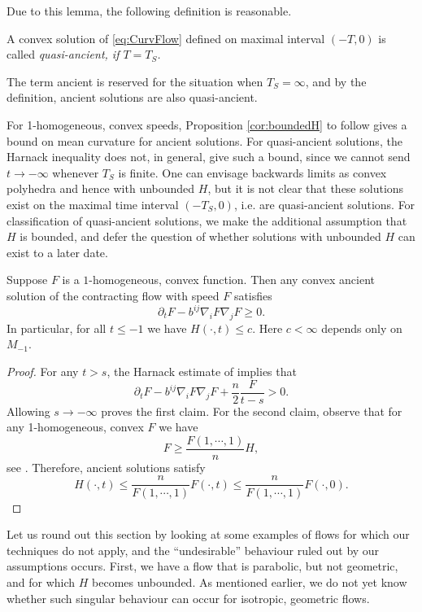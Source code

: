 \documentclass{amsart}
\begin{document}
Due to this lemma, the following definition is reasonable.

\begin{defn}
A convex solution of \eqref{eq:CurvFlow} defined on maximal interval $(-T,0)$ is called \it{quasi-ancient}, if $T=T_S$.
\end{defn}

The term ancient is reserved for the situation when \(T_S=\infty\), and by the definition, ancient solutions are also quasi-ancient.

For 1-homogeneous, convex speeds, Proposition \ref{cor:boundedH} to follow gives a bound on mean curvature for ancient solutions. For quasi-ancient solutions, the Harnack inequality does not, in general, give such a bound, since we cannot send \(t \to -\infty\) whenever \(T_S\) is finite. One can envisage backwards limits as convex polyhedra and hence with unbounded \(H\), but it is not clear that these solutions exist on the maximal time interval \((-T_S, 0)\), i.e. are quasi-ancient solutions. For classification of quasi-ancient solutions, we make the additional assumption that \(H\) is bounded, and defer the question of whether solutions with unbounded \(H\) can exist to a later date.

\begin{prop}
\label{cor:boundedH}

Suppose $F$ is a \(1\)-homogeneous, convex function. Then any convex ancient solution of the contracting flow with speed $F$ satisfies
\[\partial_t F-b^{ij}\nabla_i F \nabla_j F \geq 0.\]
In particular, for all $t\le -1$ we have
$H(\cdot,t)\leq c.$
Here $c<\infty$ depends only on $M_{-1}.$
\end{prop}

\begin{proof}
For any $t>s$, the  Harnack estimate of \cite[Theorem 1]{bryan2015harnack} implies that
$$\partial_t F-b^{ij}\nabla_i F\nabla_j F+\frac{n}{2}\frac{F}{t-s}>0.$$
Allowing $s\to-\infty$ proves the first claim. For the second claim, observe that for any 1-homogeneous, convex $F$ we have \[F\ge \frac{F(1,\cdots,1)}{n}H,\]
see \cite[Chapter 2]{Gerhardt:/2006}. Therefore, ancient solutions satisfy
\[H(\cdot,t)\leq \frac{n}{F(1,\cdots,1)}F(\cdot,t)\leq \frac{n}{F(1,\cdots,1)}F(\cdot,0). \]
\end{proof}

Let us round out this section by looking at some examples of flows for which our techniques do not apply, and the ``undesirable'' behaviour ruled out by our assumptions occurs. First, we have a flow that is parabolic, but not geometric, and for which \(H\) becomes unbounded. As mentioned earlier, we do not yet know whether such singular behaviour can occur for isotropic, geometric flows.
\end{document}
